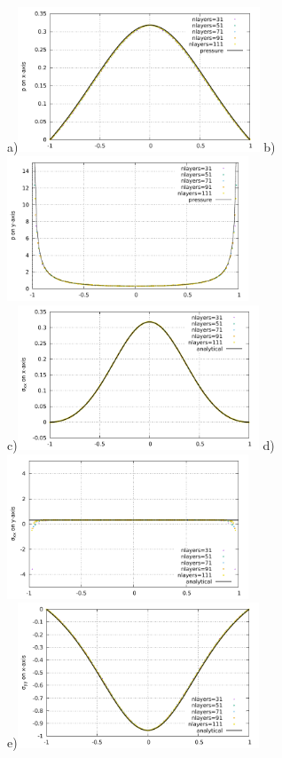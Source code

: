 \newpage
\begin{center}
a)\includegraphics[width=7.2cm]{python_codes/fieldstone_58/results/press_xaxis.pdf}
b)\includegraphics[width=7.2cm]{python_codes/fieldstone_58/results/press_yaxis.pdf}\\
c)\includegraphics[width=7.2cm]{python_codes/fieldstone_58/results/sigmaxx_xaxis.pdf}
d)\includegraphics[width=7.2cm]{python_codes/fieldstone_58/results/sigmaxx_yaxis.pdf}\\
e)\includegraphics[width=7.2cm]{python_codes/fieldstone_58/results/sigmayy_xaxis.pdf}

\end{center}
